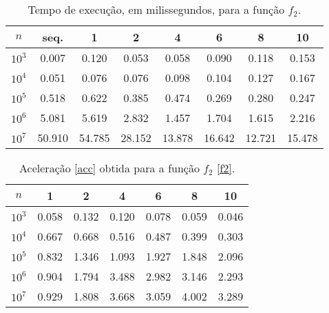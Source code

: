 \documentclass{article}
\begin{document}
      \begin{table}[h!]
        \centering
        \begin{tabular}{||c c c c c c c c||}
          \hline
          $n$ & seq. & 1 & 2 & 4 & 6 & 8 & 10 \\ 
          \hline \hline
          $10^{3}$ & 0.007 & 0.120 & 0.053 & 0.058 & 0.090 & 0.118 & 0.153 \\ 
          \hline 
          $10^{4}$ & 0.051 & 0.076 & 0.076 & 0.098 & 0.104 & 0.127 & 0.167 \\ 
          \hline 
          $10^{5}$ & 0.518 & 0.622 & 0.385 & 0.474 & 0.269 & 0.280 & 0.247 \\ 
          \hline 
          $10^{6}$ & 5.081 & 5.619 & 2.832 & 1.457 & 1.704 & 1.615 & 2.216 \\ 
          \hline 
          $10^{7}$ & 50.910 & 54.785 & 28.152 & 13.878 & 16.642 & 12.721 & 15.478 \\ 
          \hline 
        \end{tabular}
        \caption{Tempo de execução, em milissegundos, para a função $f_2$.}
        \label{f2t}
      \end{table}
    
        \begin{table}[h!]
          \centering
          \begin{tabular}{||c c c c c c c||}
            \hline
            $n$ & 1 & 2 & 4 & 6 & 8 & 10 \\ 
            \hline \hline
            $10^{3}$ & 0.058 & 0.132 & 0.120 & 0.078 & 0.059 & 0.046 \\ 
            \hline 
            $10^{4}$ & 0.667 & 0.668 & 0.516 & 0.487 & 0.399 & 0.303 \\ 
            \hline 
            $10^{5}$ & 0.832 & 1.346 & 1.093 & 1.927 & 1.848 & 2.096 \\ 
            \hline 
            $10^{6}$ & 0.904 & 1.794 & 3.488 & 2.982 & 3.146 & 2.293 \\ 
            \hline 
            $10^{7}$ & 0.929 & 1.808 & 3.668 & 3.059 & 4.002 & 3.289 \\ 
            \hline 
          \end{tabular}
          \caption{Aceleração \eqref{acc} obtida para a função $f_2$ \eqref{f2}. }
          \label{f2a}
        \end{table}
\end{document}
